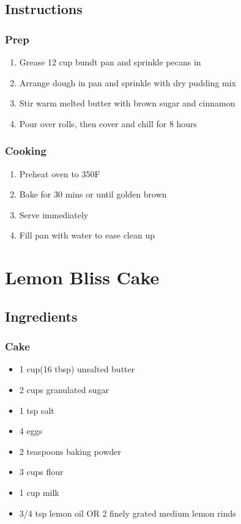 \documentclass{article}
\begin{document}
\subsection{Instructions}
\subsubsection{Prep}
\begin{enumerate}
\item Grease 12 cup bundt pan and sprinkle pecans in
\item Arrange dough in pan and sprinkle with dry pudding mix
\item Stir warm melted butter with brown sugar and cinnamon
\item Pour over rolls, then cover and chill for 8 hours
\end{enumerate}
\subsubsection{Cooking}
\begin{enumerate}
\item Preheat oven to 350\degree F
\item Bake for 30 mins or until golden brown
\item Serve immediately
\item Fill pan with water to ease clean up
\end{enumerate}


\section{Lemon Bliss Cake}
\subsection{Ingredients}
\subsubsection{Cake}
\begin{itemize}
\item 1 cup(16 tbsp) unsalted butter
\item 2 cups granulated sugar
\item 1 tsp salt
\item 4 eggs
\item 2 teaspoons baking powder
\item 3 cups flour
\item 1 cup milk
\item 3/4 tsp lemon oil OR 2 finely grated medium lemon rinds
\end{itemize}
\end{document}
